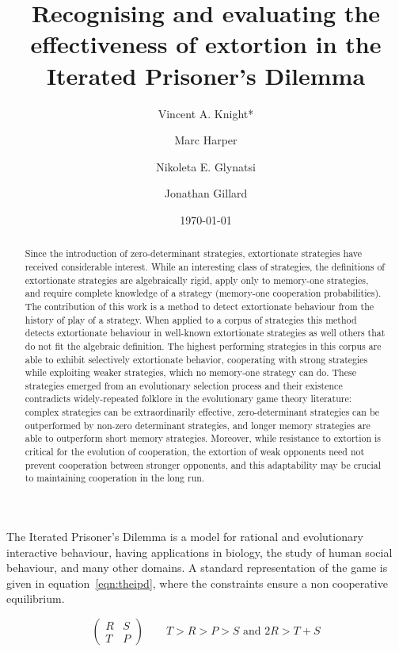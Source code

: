 \documentclass[a4paper]{article}
\title{Recognising and evaluating the effectiveness
       of extortion in the Iterated Prisoner's Dilemma}
\author[1]{Vincent A. Knight*}
\author[2]{Marc Harper}
\author[1]{Nikoleta E. Glynatsi}
\author[1]{Jonathan Gillard}
\affil[1]{Cardiff University, School of Mathematics, Cardiff, United Kingdom}
\affil[2]{Google Inc., Mountain View, CA, United States of America}
\date{\today}
\begin{document}
\maketitle

\begin{abstract}

Since the introduction of zero-determinant strategies, extortionate strategies
have received considerable interest. While an interesting class of strategies,
the definitions of extortionate strategies are algebraically rigid, apply only
to memory-one strategies, and require complete knowledge of a strategy (memory-one
cooperation probabilities). The contribution of this work  is a method to detect extortionate
behaviour from the history of play of a strategy. When applied to a corpus of
strategies this method
detects extortionate behaviour in well-known extortionate strategies as well
others that do not fit the algebraic definition. The highest performing
strategies in this corpus are able to exhibit selectively extortionate behavior,
cooperating with strong strategies while exploiting weaker strategies, which no
memory-one strategy can do. These strategies emerged from an evolutionary
selection process and their existence contradicts widely-repeated folklore in
the evolutionary game theory literature: complex strategies can be
extraordinarily effective, zero-determinant strategies can be outperformed by
non-zero determinant strategies, and longer memory strategies are able to
outperform short memory strategies. Moreover, while resistance to extortion is
critical for the evolution of cooperation, the extortion of weak opponents
need not prevent cooperation between stronger opponents, and this adaptability
may be crucial to maintaining cooperation in the long run.
\end{abstract}

The Iterated Prisoner's Dilemma is a model for rational and evolutionary
interactive behaviour, having applications in biology, the study of human
social behaviour, and many other domains. A standard representation  of the game
is given in equation~\ref{eqn:theipd}, where the constraints ensure a non cooperative
equilibrium.

\begin{equation}
    \begin{pmatrix}
        R & S \\
        T & P
    \end{pmatrix}
    \qquad
    T > R > P > S\text{ and }2 R > T + S
    \label{eqn:theipd}
\end{equation}
\end{document}
